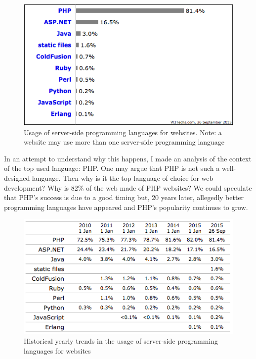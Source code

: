 \documentclass{article}
\begin{document}
\begin{figure}[h]
\centering\includegraphics[scale=0.7]{serverlangs.png}
\caption{\label{fig:serverlangs} Usage of server-side programming languages for websites. Note: a website may use more than one server-side programming language}
\end{figure}

In an attempt to understand why this happens, I made an analysis of the context of the top used language: PHP. One may argue that PHP is not such a well-designed language. Then why is it the top language of choice for web development? Why is 82\% of the web made of PHP websites? We could speculate that PHP's success is due to a good timing but, 20 years later, allegedly better programming languages have appeared and PHP's popularity continues to grow\autocite{phptime}.\\

\clearpage
\begin{figure}[h]
\centering\includegraphics[scale=0.7]{serverlangstime.png}
\caption{\label{fig:serverlangstime} Historical yearly trends in the usage of server-side programming languages for websites}
\end{figure}
\end{document}
